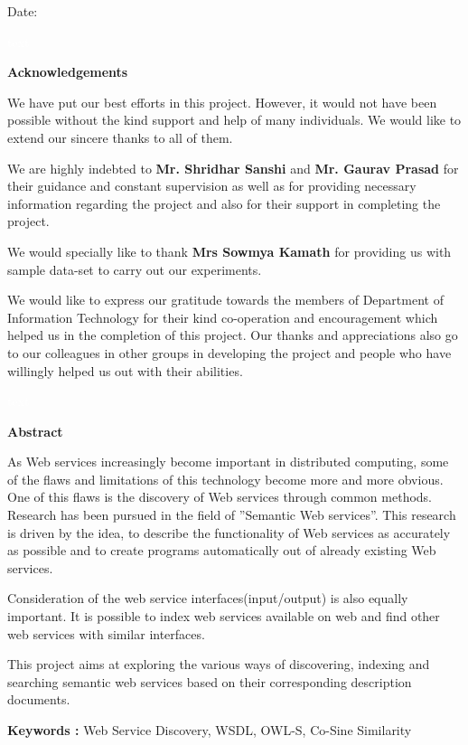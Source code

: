 \documentclass[12pt, twoside]{book}
\begin{document}
\vspace{2cm}

Date: \underline{\hspace{5cm}}

\pagebreak \textcolor{white}{text} \pagebreak
\thispagestyle{empty}
\begin{center}
\Huge
\textbf{Acknowledgements} \\
\vspace{2cm}
\end{center}
We have put our best efforts in this project.
However, it would not have been possible without the kind support and help of many individuals.
We would like to extend our sincere thanks to all of them.\\ \par
We are highly indebted to \textbf{Mr. Shridhar Sanshi} and \textbf{Mr. Gaurav Prasad} for their guidance and constant supervision as well as for providing necessary information regarding the project and also for their support in completing the project.\\ \par
We would specially like to thank \textbf{Mrs Sowmya Kamath} for providing us with sample data-set to carry out our experiments.\\ \par
We would like to express our gratitude towards the members of Department of Information Technology for their kind co-operation and encouragement which helped us in the completion of this project. Our thanks and appreciations also go to our colleagues in other groups in developing the project and people who have willingly helped us out with their abilities.

\pagebreak \textcolor{white}{text} \pagebreak
\thispagestyle{empty}
\begin{center}
	\textbf{ \huge Abstract}
\end{center}
\vspace{1cm}
As Web services increasingly become important in distributed computing, some of the flaws and limitations of this technology become more and more obvious. One of this flaws is the discovery of Web services through common methods. Research has been pursued in the field of ”Semantic Web services”. This research is driven by the idea, to describe the functionality of Web services as accurately as possible and to create programs automatically out of already existing Web services. \\ \par
Consideration of the web service interfaces(input/output) is also equally important. It is possible to index web services available on web and find other web services with similar interfaces.\\
\par
This project aims at exploring the various ways of discovering, indexing and searching semantic web services based on their corresponding description documents. \\
\par
\textbf{Keywords : }Web Service Discovery, WSDL, OWL-S, Co-Sine Similarity
\end{document}
